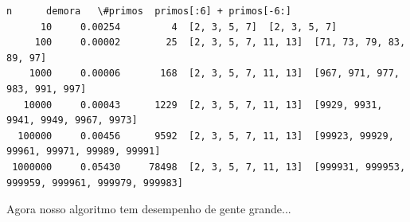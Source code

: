 \documentclass[11pt,a4paper]{article}
\begin{document}
    \begin{Verbatim}[commandchars=\\\{\}]
       n      demora   \#primos  primos[:6] + primos[-6:]
      10     0.00254         4  [2, 3, 5, 7]  [2, 3, 5, 7]
     100     0.00002        25  [2, 3, 5, 7, 11, 13]  [71, 73, 79, 83, 89, 97]
    1000     0.00006       168  [2, 3, 5, 7, 11, 13]  [967, 971, 977, 983, 991, 997]
   10000     0.00043      1229  [2, 3, 5, 7, 11, 13]  [9929, 9931, 9941, 9949, 9967, 9973]
  100000     0.00456      9592  [2, 3, 5, 7, 11, 13]  [99923, 99929, 99961, 99971, 99989, 99991]
 1000000     0.05430     78498  [2, 3, 5, 7, 11, 13]  [999931, 999953, 999959, 999961, 999979, 999983]

    \end{Verbatim}

    Agora nosso algoritmo tem desempenho de gente grande...


    
    
    
    
\end{document}
